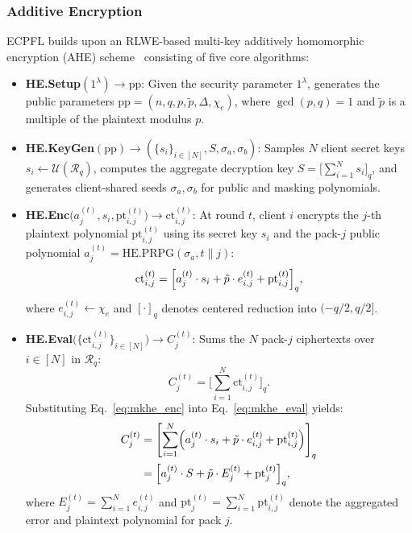 \subsubsection{Additive Encryption}
\textsc{ECPFL} builds upon an RLWE-based multi-key additively homomorphic encryption (AHE) scheme~\cite{wu2025esafl} consisting of five core algorithms:
\begin{itemize}[leftmargin=*]
\item  \textbf{HE.Setup}$(1^\lambda) \to \mathrm{pp}$: Given the security parameter $1^\lambda$, generates the public parameters $\mathrm{pp} = (n, q, p, \tilde{p}, \Delta, \chi_e)$, where $\gcd(p, q) = 1$ and $\tilde{p}$ is a multiple of the plaintext modulus $p$.

\item  \textbf{HE.KeyGen}$(\mathrm{pp}) \to (\{s_i\}_{i \in [N]}, S, \sigma_a, \sigma_b)$: Samples $N$ client secret keys $s_i \leftarrow \mathcal{U}(\mathcal{R}_q)$, computes the aggregate decryption key $S = \bigl[\sum_{i=1}^{N} s_i\bigr]_q$, and generates client-shared seeds $\sigma_a, \sigma_b$ for public and masking polynomials.

\item  \textbf{HE.Enc}$\bigl(a_j^{(t)}, s_i, \mathrm{pt}_{i,j}^{(t)}\bigr) \to \mathrm{ct}_{i,j}^{(t)}$: At round $t$, client $i$ encrypts the $j$-th plaintext polynomial $\mathrm{pt}_{i,j}^{(t)}$ using its secret key $s_i$ and the pack-$j$ public polynomial $a_j^{(t)} = \mathrm{HE.PRPG}(\sigma_a, t \parallel j)$:
\begin{equation}
\label{eq:mkhe_enc}
\mathrm{ct}_{i,j}^{(t)} = \Bigl[a_j^{(t)} \cdot s_i + \tilde{p} \cdot e_{i,j}^{(t)} + \mathrm{pt}_{i,j}^{(t)}\Bigr]_q,
\end{equation}
where $e_{i,j}^{(t)} \leftarrow \chi_e$ and $[\cdot]_q$ denotes centered reduction into $(-q/2, q/2]$.

\item  \textbf{HE.Eval}$\bigl(\{\mathrm{ct}_{i,j}^{(t)}\}_{i \in [N]}\bigr) \to C_j^{(t)}$: Sums the $N$ pack-$j$ ciphertexts over $i \in [N]$ in $\mathcal{R}_q$:
\begin{equation}
\label{eq:mkhe_eval}
C_j^{(t)} = \Biggl[\sum_{i=1}^{N} \mathrm{ct}_{i,j}^{(t)}\Biggr]_q.
\end{equation}
Substituting Eq.~\eqref{eq:mkhe_enc} into Eq.~\eqref{eq:mkhe_eval} yields:
\begin{align}
C_j^{(t)} &= \Biggl[\sum_{i=1}^{N} \Bigl(a_j^{(t)} \cdot s_i + \tilde{p} \cdot e_{i,j}^{(t)} + \mathrm{pt}_{i,j}^{(t)}\Bigr)\Biggr]_q \notag \\
&= \Bigl[a_j^{(t)} \cdot S + \tilde{p} \cdot E_j^{(t)} + \mathrm{pt}_j^{(t)}\Bigr]_q,
\label{eq:mkhe_agg}
\end{align}
where $E_j^{(t)} = \sum_{i=1}^{N} e_{i,j}^{(t)}$ and $\mathrm{pt}_j^{(t)} = \sum_{i=1}^{N} \mathrm{pt}_{i,j}^{(t)}$ denote the aggregated error and plaintext polynomial for pack $j$.


\end{itemize}
